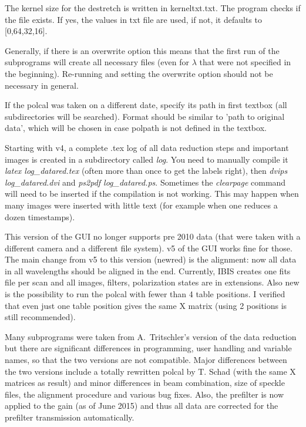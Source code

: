 \documentclass[a4paper,11pt]{article}
\begin{document}
The kernel size for the destretch is written in kerneltxt.txt. The program checks if
the file exists. If yes, the values in txt file are used, if not, it defaults to [0,64,32,16].

Generally, if there is an overwrite option this means that the first
run of the subprograms will create all necessary files (even for $\lambda$
that were not specified in the beginning). Re-running and setting the
overwrite option should not be necessary in general.

If the polcal was taken on a different date, specify its path in first
textbox (all subdirectories will be searched). Format should be
similar to 'path to original data', which will be chosen in case
polpath is not defined in the textbox.

Starting with v4, a complete .tex log of all data reduction steps and
important images is created in a subdirectory called \textit{log}. You
need to manually compile it \textit{latex log\_datared.tex} (often more than
once to get the labels right), then \textit{dvips log\_datared.dvi}
and \textit{ps2pdf log\_datared.ps}. Sometimes the \textit{clearpage}
command will need to be inserted if the compilation is not working. This may happen when many images were inserted with little text (for example when one reduces a dozen timestamps).

This version of the GUI no longer supports pre 2010 data (that were
taken with a different camera and a different file system). v5 of the
GUI works fine for those. The main change from v5 to this version (newred) is
the alignment: now all data in all wavelengths should be aligned in
the end. Currently, IBIS creates one fits file per scan and all
images, filters, polarization states are in extensions. Also new is
the possibility to run the polcal with fewer than 4 table positions. I
verified that even just one table position gives the same X matrix
(using 2 positions is still recommended).

Many subprograms were taken from A.~Tritschler's version of the data reduction but there are significant differences in programming, user handling and variable names, so that the two versions are not compatible. Major differences between the two versions include a totally rewritten polcal by T. Schad (with the same X matrices as result) and minor differences in beam combination, size of speckle files, the alignment procedure and various bug fixes. Also, the prefilter is now applied to the gain (as of June 2015) and thus all data are corrected for the prefilter transmission automatically.
\end{document}
